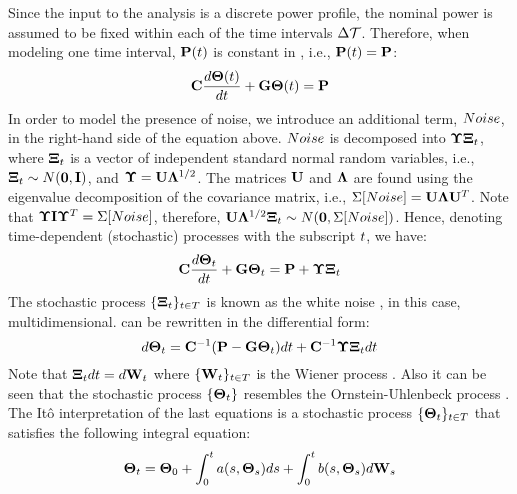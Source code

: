 Since the input to the analysis is a discrete power profile, the nominal power is assumed to be fixed within each of the time intervals $\Delta \mathcal{T}$. Therefore, when modeling one time interval, $\mathbf{P}(t)$ is constant in , i.e., $\mathbf{P}(t) = \mathbf{P}$:
\begin{equation} \equlabel{fourier-constant-power}
  \mcapacitance \frac{d\vtemperature(\time)}{d\time} + \mconductance \vtemperature(\time) = \vpower
\end{equation}
In order to model the presence of noise, we introduce an additional term, $Noise$, in the right-hand side of the equation above. $Noise$ is decomposed into $\mathbf{\Upsilon} \mathbf{\Xi}_t$, where $\mathbf{\Xi}_t$ is a vector of independent standard normal random variables, i.e., $\mathbf{\Xi}_t \sim N(\mathbf{0}, \mathbf{I})$, and  $\mathbf{\Upsilon} = \mathbf{U} \mathbf{\Lambda}^{1/2}$. The matrices $\mathbf{U}$ and $\mathbf{\Lambda}$ are found using the eigenvalue decomposition of the covariance matrix, i.e., $\Sigma[Noise] = \mathbf{U} \mathbf{\Lambda} \mathbf{U}^T$. Note that $\mathbf{\Upsilon} \mathbf{I} \mathbf{\Upsilon}^T = \Sigma[Noise]$, therefore, $\mathbf{U} \mathbf{\Lambda}^{1/2} \mathbf{\Xi}_t \sim N(\mathbf{0}, \Sigma[Noise])$. Hence, denoting time-dependent (stochastic) processes with the subscript $t$, we have:
\begin{equation} \equlabel{fourier-noise}
  \mcapacitance \frac{d\vtemperature_\time}{d\time} + \mconductance \vtemperature_\time = \vpower + \mnoisedeviation \vnoise_t
\end{equation}
The stochastic process $\{ \mathbf{\Xi}_t \}_{t \in T}$ is known as the white noise \cite{oksendal2003}, in this case, multidimensional.  can be rewritten in the differential form:
\begin{equation} \equlabel{fourier-wiener}
  d\vtemperature_\time = \mcapacitance^{-1}(\vpower - \mconductance \vtemperature_\time)d\time + \mcapacitance^{-1} \mnoisedeviation \vnoise_t d\time
\end{equation}
Note that $\mathbf{\Xi}_t dt = d\mathbf{W}_t$ where $\{ \mathbf{W}_t \}_{t \in T}$ is the Wiener process \cite{oksendal2003}. Also it can be seen that the stochastic process $\{ \mathbf{\Theta}_t \}$ resembles the Ornstein-Uhlenbeck process \cite{kloeden1992}. The It\^{o} interpretation \cite{oksendal2003} of the last equations is a stochastic process $\{ \mathbf{\Theta}_t \}_{t \in T}$ that satisfies the following integral equation:
\[
  \mathbf{\Theta}_t = \mathbf{\Theta}_0 + \int_0^t a(s, \mathbf{\Theta}_s)ds + \int_0^t b(s, \mathbf{\Theta}_s) d\mathbf{W}_s
\]
